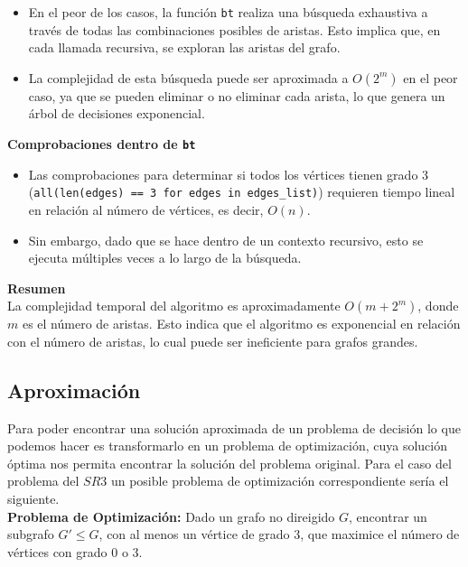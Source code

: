 \documentclass[
10pt, %
a4paper, %
oneside, %
headinclude,footinclude, %
BCOR5mm, %
]{scrartcl}
\begin{document}
\begin{itemize}
    \item En el peor de los casos, la función \texttt{bt} realiza una búsqueda exhaustiva a través de todas las combinaciones posibles de aristas. Esto implica que, en cada llamada recursiva, se exploran las aristas del grafo.
    \item La complejidad de esta búsqueda puede ser aproximada a \( O(2^m) \) en el peor caso, ya que se pueden eliminar o no eliminar cada arista, lo que genera un árbol de decisiones exponencial.
\end{itemize}


\textbf{Comprobaciones dentro de \texttt{bt}}\\

\begin{itemize}
    \item Las comprobaciones para determinar si todos los vértices tienen grado 3 (\texttt{all(len(edges) == 3 for edges in edges\_list)}) requieren tiempo lineal en relación al número de vértices, es decir, \( O(n) \).
    \item Sin embargo, dado que se hace dentro de un contexto recursivo, esto se ejecuta múltiples veces a lo largo de la búsqueda.
\end{itemize}


\textbf{Resumen}\\
La complejidad temporal del algoritmo es aproximadamente \( O(m + 2^m) \), donde \( m \) es el número de aristas. Esto indica que el algoritmo es exponencial en relación con el número de aristas, lo cual puede ser ineficiente para grafos grandes.


\subsection{Aproximación}

Para poder encontrar una solución aproximada de un problema de decisión lo que podemos hacer es transformarlo en un problema de optimización, 
cuya solución óptima nos permita encontrar la solución del problema original. Para el caso del problema del $SR3$ un posible problema de optimización correspondiente sería el siguiente. \\

\textbf{ Problema de Optimización:} Dado un grafo no direigido $G$, encontrar un subgrafo $G' \leq G$, con al menos un vértice de grado 3, que maximice el número de vértices con grado 0 o 3. \\
\end{document}
